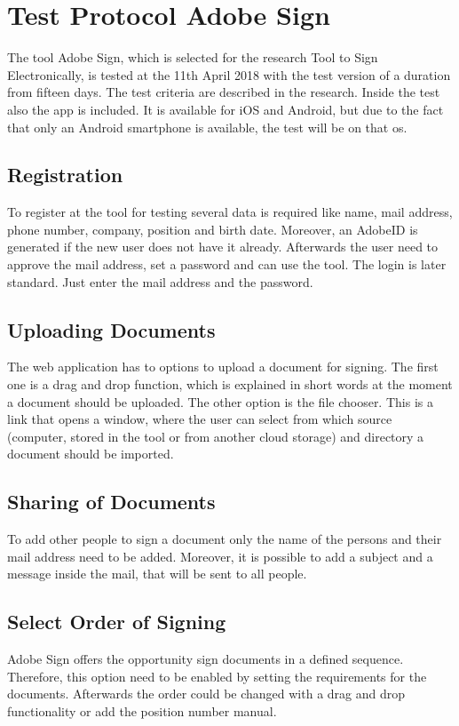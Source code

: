 \section{Test Protocol Adobe Sign}
\label{tool:sec:adobesign}
The tool Adobe Sign, which is selected for the research Tool to Sign Electronically, is tested at the 11th April 2018 with the test version of a duration from fifteen days. The test criteria are described in the research. Inside the test also the \gls{app} is included. It is available for iOS and Android, but due to the fact that only an Android smartphone is available, the test will be on that \gls{os}.

\subsection{Registration}
To register at the tool for testing several data is required like name, mail address, phone number, company, position and birth date. Moreover, an AdobeID is generated if the new user does not have it already. Afterwards the user need to approve the mail address, set a password and can use the tool. The login is later standard. Just enter the mail address and the password.

\subsection{Uploading Documents}
The web application has to options to upload a document for signing. The first one is a drag and drop function, which is explained in short words at the moment a document should be uploaded. The other option is the file chooser. This is a link that opens a window, where the user can select from which source (computer, stored in the tool or from another cloud storage) and directory a document should be imported.

\subsection{Sharing of Documents}
To add other people to sign a document only the name of the persons and their mail address need to be added. Moreover, it is possible to add a subject and a message inside the mail, that will be sent to all people.

\subsection{Select Order of Signing}
Adobe Sign offers the opportunity sign documents in a defined sequence. Therefore, this option need to be enabled by setting the requirements for the documents. Afterwards the order could be changed with a drag and drop functionality or add the position number manual.

